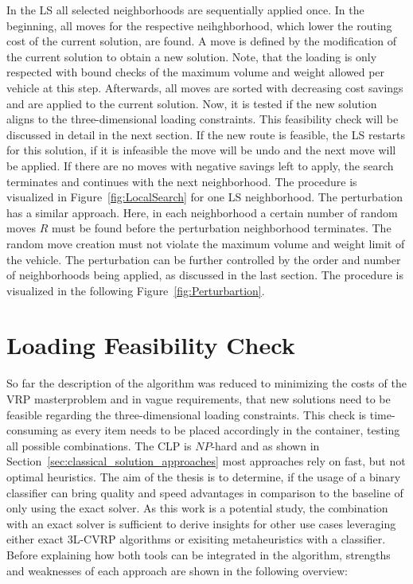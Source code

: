 In the \gls{LS} all selected neighborhoods are sequentially applied once. In the beginning, all moves for the respective neihghborhood,
which lower the routing cost of the current solution, are found. A move is defined by the modification of the current solution to
obtain a new solution. Note, that the loading is only respected with bound checks of the maximum volume and weight
allowed per vehicle at this step. Afterwards, all moves are sorted with decreasing cost savings and are applied to the current solution. Now, it is tested
if the new solution aligns to the three-dimensional loading constraints. This feasibility check will be discussed in
detail in the next section. If the new route is feasible, the \gls{LS} restarts for this solution, if it is infeasible
the move will be undo and the next move will be applied. If there are no moves with negative savings left to apply, the search
terminates and continues with the next neighborhood. The procedure is visualized in Figure~\ref{fig:LocalSearch} for one \gls{LS} neighborhood.
The perturbation has a similar approach. Here, in each neighborhood a certain number of random moves $R$ must be found
before the perturbation neighborhood terminates. The random move creation must not violate the maximum volume and weight limit of the vehicle.
The perturbation can be further controlled by the order and number of neighborhoods being applied, as discussed in the last section.
The procedure is visualized in the following Figure~\ref{fig:Perturbartion}.


\section{Loading Feasibility Check}
\label{sec:FeasibilityCheck}
So far the description of the algorithm was reduced to minimizing the costs of the \gls{VRP} masterproblem and in vague
requirements, that new solutions need to be feasible regarding the three-dimensional loading constraints.
This check is time-consuming as every item needs to be placed accordingly in the container, testing all possible combinations.
The \gls{CLP} is $NP$-hard and as shown in Section~\ref{sec:classical_solution_approaches} most approaches rely on fast, but not
optimal heuristics. The aim of the thesis is to determine, if the usage of a binary classifier can bring quality and
speed advantages in comparison to the baseline of only using the exact solver.
As this work is a potential study, the combination with an exact solver is sufficient to derive insights for other use cases
leveraging either exact \gls{3L-CVRP} algorithms or exisiting metaheuristics with a classifier.
Before explaining how both tools can be integrated in the algorithm, strengths and weaknesses of
each approach are shown in the following overview:

